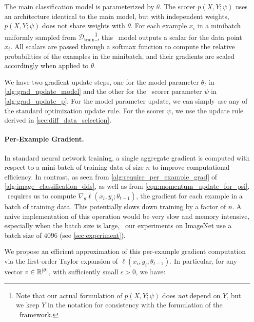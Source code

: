 The main  classification model is parameterized by $\theta$. The scorer $p(X, Y; \psi)$ uses an architecture identical to the main model, but with independent weights, \ie~$p(X, Y; \psi)$ does not share weights with $\theta$. For each example $x_i$ in a minibatch uniformly sampled from $\mathcal{D}_\text{train}$\footnote{Note that our actual formulation of $p(X, Y; \psi)$ does \textit{not} depend on $Y$, but we keep $Y$ in the notation for consistency with the formulation of the \dds~framework.}, this \dds~model outputs a scalar for the data point $x_i$. All scalars are passed through a softmax function to compute the relative probabilities of the examples in the minibatch, and their gradients are scaled accordingly when applied to $\theta$. 

We have two gradient update steps, one for the model parameter $\theta_t$ in \autoref{alg:grad_update_model} and the other for the \dds~scorer parameter $\psi$ in \autoref{alg:grad_update_p}. For the model parameter update, we can simply use any of the standard optimization update rule. For the scorer $\psi$, we use the update rule derived in \autoref{sec:diff_data_selection}.

\paragraph{Per-Example Gradient.}
In standard neural network training, a single aggregate gradient is computed with respect to a mini-batch of training data of size $n$ to improve computational efficiency. In contrast, as seen from \autoref{alg:require_per_example_grad} of \autoref{alg:image_classification_dds}, as well as from \autoref{eqn:momentum_update_for_psi}, \dds~requires us to compute $\nabla_\theta \ell(x_i, y_i; \theta_{t-1})$, the gradient for each example in a batch of training data. This potentially slows down training by a factor of $n$. A naive implementation of this operation would be very slow and memory intensive, especially when the batch size is large, \eg~our experiments on ImageNet use a batch size of $4096$ (see \autoref{sec:experiment}).  

We propose an efficient approximation of this per-example gradient computation via the first-order Taylor expansion of $\ell(x_i, y_i; \theta_{t-1})$. In particular, for any vector $v \in \mathbb{R}^{\left| \theta \right|}$, with sufficiently small $\epsilon > 0$, we have:

